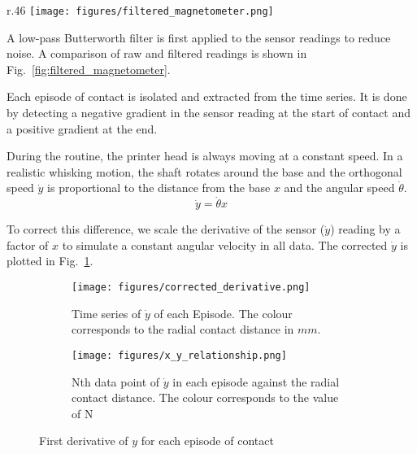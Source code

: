 \documentclass[runningheads]{llncs}
\begin{document}
\begin{wrapfigure}{r}{.46\textwidth}
    \centering
    \texttt{[image: figures/filtered\_magnetometer.png]}
    \caption{Raw and Filtered Magnetometer Reading in the Y-Axis }
    \label{fig:filtered_magnetometer}
\end{wrapfigure}

A low-pass Butterworth filter is first applied to the sensor readings to reduce noise. A comparison of raw and filtered readings is shown in Fig.~\ref{fig:filtered_magnetometer}.

Each episode of contact is isolated and extracted from the time series. It is done by detecting a negative gradient in the sensor reading at the start of contact and a positive gradient at the end. 

During the routine, the printer head is always moving at a constant speed. In a realistic whisking motion, the shaft rotates around the base and the orthogonal speed \(\dot{y}\) is proportional to the distance from the base \(x\) and the angular speed \(\dot{\theta}\).
\begin{equation}\label{eq:linear_relationship}
\dot{y} = \dot{\theta}x
\end{equation}

To correct this difference, we scale the derivative of the sensor (\(\dot{y}\)) reading by a factor of \(x\) to simulate a constant angular velocity in all data. The corrected \(\dot{y}\) is plotted in Fig.~\ref{fig:corrected_derivative.png}.

\begin{figure}
    \centering
    \begin{subfigure}[t]{.45\textwidth}
        \centering
        \texttt{[image: figures/corrected\_derivative.png]}
        \caption{Time series of \(\dot{y}\) of each Episode. The colour corresponds to the radial contact distance in $mm$.}
        \label{fig:corrected_derivative.png}
    \end{subfigure}
    \hspace{1pt}
    \begin{subfigure}[t]{.45\textwidth}
        \centering
        \texttt{[image: figures/x\_y\_relationship.png]}
        \caption{Nth data point of \(\dot{y}\) in each episode against the radial contact distance. The colour corresponds to the value of N}
        \label{fig:x_y_relationship.png}
    \end{subfigure}
    \vspace{-5pt}
    \caption{First derivative of \(y\) for each episode of contact}
    \label{fig:episode_analysis}
\end{figure}
\end{document}
